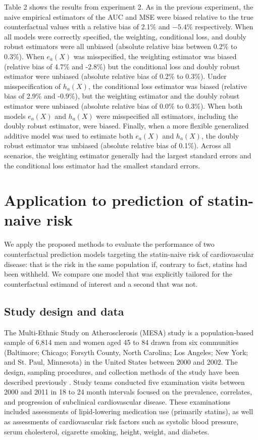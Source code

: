Table 2 shows the results from experiment 2. As in the previous experiment, the naive empirical estimators of the AUC and MSE were biased relative to the true counterfactual values with a relative bias of 2.1\% and $-5.4\%$ respectively. When all models were correctly specified, the weighting, conditional loss, and doubly robust estimators were all unbiased (absolute relative bias between 0.2\% to 0.3\%). When $e_a(X)$ was misspecified, the weighting estimator was biased (relative bias of 4.7\% and -2.8\%) but the conditional loss and doubly robust estimator were unbiased (absolute relative bias of 0.2\% to 0.3\%). Under misspecification of $h_a(X)$, the conditional loss estimator was biased (relative bias of 2.9\% and -0.9\%), but the weighting estimator and the doubly robust estimator were unbiased (absolute relative bias of 0.0\% to 0.3\%). When both models $e_a(X)$ and $h_a(X)$ were misspecified all estimators, including the doubly robust estimator, were biased. Finally, when a more flexible generalized additive model was used to estimate both $e_a(X)$ and $h_a(X)$, the doubly robust estimator was unbiased (absolute relative bias of 0.1\%). Across all scenarios, the weighting estimator generally had the largest standard errors and the conditional loss estimator had the smallest standard errors.




\section{Application to prediction of statin-naive risk} \label{sec:results}

We apply the proposed methods to evaluate the performance of two counterfactual prediction models targeting the statin-naive risk of cardiovascular disease: that is the risk in the same population if, contrary to fact, statins had been withheld. We compare one model that was explicitly tailored for the counterfactual estimand of interest and a second that was not. 

\subsection{Study design and data}
The Multi-Ethnic Study on Atherosclerosis (MESA) study is a population-based sample of 6,814 men and women aged 45 to 84 drawn from six communities (Baltimore; Chicago; Forsyth County, North Carolina; Los Angeles; New York; and St. Paul, Minnesota) in the United States between 2000 and 2002. The design, sampling procedures, and collection methods of the study have been described previously \cite{bild_multi-ethnic_2002}. Study teams conducted five examination visits between 2000 and 2011 in 18 to 24 month intervals focused on the prevalence, correlates, and progression of subclinical cardiovascular disease. These examinations included assessments of lipid-lowering medication use (primarily statins), as well as assessments of cardiovascular risk factors such as systolic blood pressure, serum cholesterol, cigarette smoking, height, weight, and diabetes. 

